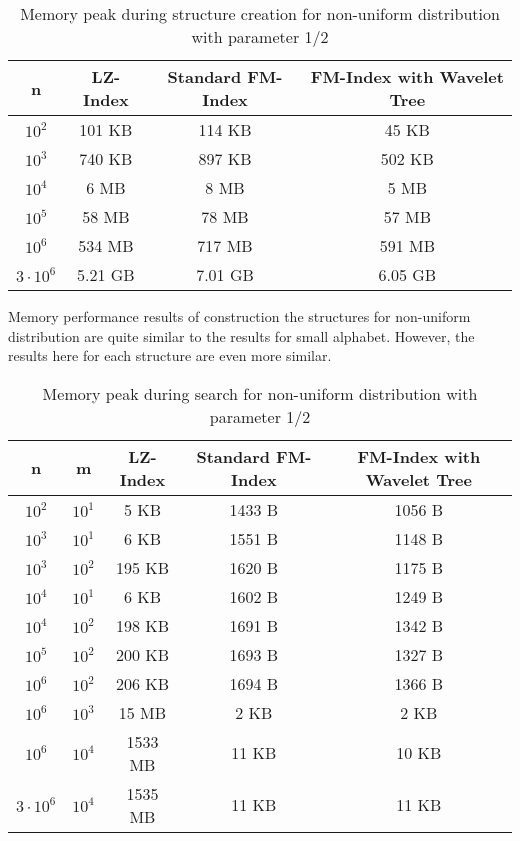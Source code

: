 \begin{table}[H]
\begin{center}
\caption{Memory peak during structure creation for non-uniform distribution with parameter 1/2}
\begin{tabular}{|c|c|c|c|}
\hline
\rowcolor[HTML]{C0C0C0}
n & LZ-Index & Standard FM-Index & FM-Index with Wavelet Tree \\ \hline
$10^{2}$ & 101 KB & 114 KB & 45 KB \\ \hline
$10^{3}$ & 740 KB & 897 KB & 502 KB \\ \hline
$10^{4}$ & 6 MB & 8 MB & 5 MB \\ \hline
$10^{5}$ & 58 MB & 78 MB & 57 MB \\ \hline
$10^{6}$ & 534 MB & 717 MB & 591 MB \\ \hline
$3 \cdot 10^{6}$ & 5.21 GB & 7.01 GB & 6.05 GB \\ \hline
\end{tabular}
\end{center}
\end{table}

Memory performance results of construction the structures for non-uniform distribution are quite similar to the results for small alphabet. However, the results here for each structure are even more similar.

\begin{table}[H]
\begin{center}
\caption{Memory peak during search for non-uniform distribution with parameter 1/2}
\begin{tabular}{|c|c|c|c|c|}
\hline
\rowcolor[HTML]{C0C0C0}
n & m & LZ-Index & Standard FM-Index & FM-Index with Wavelet Tree \\ \hline
$10^{2}$ & $10^{1}$ & 5 KB & 1433 B & 1056 B \\ \hline
$10^{3}$ & $10^{1}$ & 6 KB & 1551 B & 1148 B \\ \hline
$10^{3}$ & $10^{2}$ & 195 KB & 1620 B & 1175 B \\ \hline
$10^{4}$ & $10^{1}$ & 6 KB & 1602 B & 1249 B \\ \hline
$10^{4}$ & $10^{2}$ & 198 KB & 1691 B & 1342 B \\ \hline
$10^{5}$ & $10^{2}$ & 200 KB & 1693 B & 1327 B \\ \hline
$10^{6}$ & $10^{2}$ & 206 KB & 1694 B & 1366 B \\ \hline
$10^{6}$ & $10^{3}$ & 15 MB & 2 KB & 2 KB \\ \hline
$10^{6}$ & $10^{4}$ & 1533 MB & 11 KB & 10 KB \\ \hline
$3 \cdot 10^{6}$ & $10^{4}$ & 1535 MB & 11 KB & 11 KB \\ \hline
\end{tabular}
\end{center}
\end{table}

